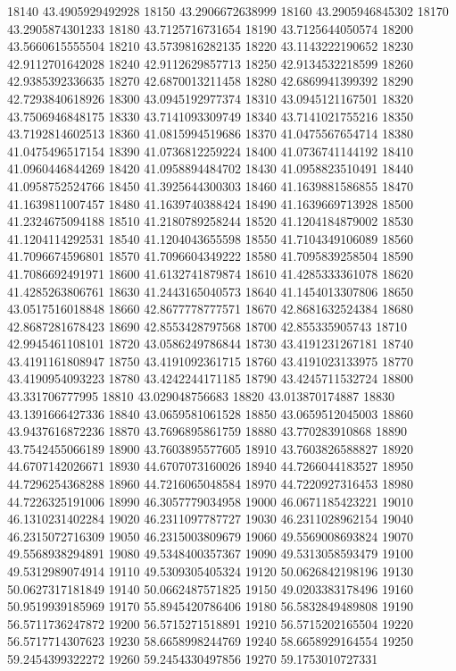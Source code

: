 {18140 43.4905929492928
18150 43.2906672638999
18160 43.2905946845302
18170 43.2905874301233
18180 43.7125716731654
18190 43.7125644050574
18200 43.5660615555504
18210 43.5739816282135
18220 43.1143222190652
18230 42.9112701642028
18240 42.9112629857713
18250 42.9134532218599
18260 42.9385392336635
18270 42.6870013211458
18280 42.6869941399392
18290 42.7293840618926
18300 43.0945192977374
18310 43.0945121167501
18320 43.7506946848175
18330 43.7141093309749
18340 43.7141021755216
18350 43.7192814602513
18360 41.0815994519686
18370 41.0475567654714
18380 41.0475496517154
18390 41.0736812259224
18400 41.0736741144192
18410 41.0960446844269
18420 41.0958894484702
18430 41.0958823510491
18440 41.0958752524766
18450 41.3925644300303
18460 41.1639881586855
18470 41.1639811007457
18480 41.1639740388424
18490 41.1639669713928
18500 41.2324675094188
18510 41.2180789258244
18520 41.1204184879002
18530 41.1204114292531
18540 41.1204043655598
18550 41.7104349106089
18560 41.7096674596801
18570 41.7096604349222
18580 41.7095839258504
18590 41.7086692491971
18600 41.6132741879874
18610 41.4285333361078
18620 41.4285263806761
18630 41.2443165040573
18640 41.1454013307806
18650 43.0517516018848
18660 42.8677778777571
18670 42.8681632524384
18680 42.8687281678423
18690 42.8553428797568
18700 42.855335905743
18710 42.9945461108101
18720 43.0586249786844
18730 43.4191231267181
18740 43.4191161808947
18750 43.4191092361715
18760 43.4191023133975
18770 43.4190954093223
18780 43.4242244171185
18790 43.4245711532724
18800 43.331706777995
18810 43.029048756683
18820 43.013870174887
18830 43.1391666427336
18840 43.0659581061528
18850 43.0659512045003
18860 43.9437616872236
18870 43.7696895861759
18880 43.770283910868
18890 43.7542455066189
18900 43.7603895577605
18910 43.7603826588827
18920 44.6707142026671
18930 44.6707073160026
18940 44.7266044183527
18950 44.7296254368288
18960 44.7216065048584
18970 44.7220927316453
18980 44.7226325191006
18990 46.3057779034958
19000 46.0671185423221
19010 46.1310231402284
19020 46.2311097787727
19030 46.2311028962154
19040 46.2315072716309
19050 46.2315003809679
19060 49.5569008693824
19070 49.5568938294891
19080 49.5348400357367
19090 49.5313058593479
19100 49.5312989074914
19110 49.5309305405324
19120 50.0626842198196
19130 50.0627317181849
19140 50.0662487571825
19150 49.0203383178496
19160 50.9519939185969
19170 55.8945420786406
19180 56.5832849489808
19190 56.5711736247872
19200 56.5715271518891
19210 56.5715202165504
19220 56.5717714307623
19230 58.6658998244769
19240 58.6658929164554
19250 59.2454399322272
19260 59.2454330497856
19270 59.1753010727331
}
